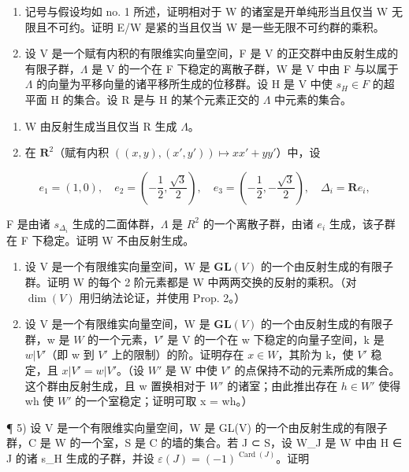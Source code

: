 
\begin{enumerate}
\def\labelenumi{\arabic{enumi})}
\item
  记号与假设均如 no. 1 所述，证明相对于 W 的诸室是开单纯形当且仅当 W 无限且不可约。证明 E/W 是紧的当且仅当 W 是一些无限不可约群的乘积。
\item
  设 V 是一个赋有内积的有限维实向量空间，F 是 V 的正交群中由反射生成的有限子群，\(\Lambda\) 是 V 的一个在 F 下稳定的离散子群，W 是 V 中由 F 与以属于 \(\Lambda\) 的向量为平移向量的诸平移所生成的位移群。设 H 是 V 中使 \(s_{H} \in F\) 的超平面 H 的集合。设 R 是与 H 的某个元素正交的 \(\Lambda\) 中元素的集合。
\end{enumerate}

\begin{enumerate}
\def\labelenumi{\alph{enumi})}
\item
  W 由反射生成当且仅当 R 生成 \(\Lambda\)。
\item
  在 \(\mathbf{R}^2\)（赋有内积 \(((x,y),(x',y'))\mapsto xx' + yy'\)）中，设
\end{enumerate}

\[
e _ {1} = (1, 0), \quad e _ {2} = \left(- \frac {1}{2}, \frac {\sqrt {3}}{2}\right), \quad e _ {3} = \left(- \frac {1}{2}, - \frac {\sqrt {3}}{2}\right), \quad \Delta_ {i} = \mathbf {R} e _ {i},
\]

F 是由诸 \(s_{\Delta_{i}}\) 生成的二面体群，\(\Lambda\) 是 \(R^{2}\) 的一个离散子群，由诸 \(e_{i}\) 生成，该子群在 F 下稳定。证明 W 不由反射生成。

\begin{enumerate}
\def\labelenumi{\arabic{enumi})}
\setcounter{enumi}{2}
\item
  设 V 是一个有限维实向量空间，W 是 \(\mathbf{GL}(V)\) 的一个由反射生成的有限子群。证明 W 的每个 2 阶元素都是 W 中两两交换的反射的乘积。（对 \(\dim(V)\) 用归纳法论证，并使用 Prop. 2。）
\item
  设 V 是一个有限维实向量空间，W 是 \(\mathbf{GL}(V)\) 的一个由反射生成的有限子群，w 是 \(W\) 的一个元素，\(V'\) 是 V 的一个在 w 下稳定的向量子空间，k 是 \(w|V'\)（即 w 到 \(V'\) 上的限制）的阶。证明存在 \(x \in W\)，其阶为 k，使 \(V'\) 稳定，且 \(x|V' = w|V'\)。（设 \(W'\) 是 W 中使 \(V'\) 的点保持不动的元素所成的集合。这个群由反射生成，且 w 置换相对于 \(W'\) 的诸室；由此推出存在 \(h \in W'\) 使得 wh 使 \(W'\) 的一个室稳定；证明可取 x = wh。）
\end{enumerate}

¶ 5) 设 V 是一个有限维实向量空间，W 是 GL(V) 的一个由反射生成的有限子群，C 是 W 的一个室，S 是 C 的墙的集合。若 J ⊂ S，设 W\_J 是 W 中由 H ∈ J 的诸 s\_H 生成的子群，并设 \(\varepsilon(J) = (-1)^{\operatorname{Card}(J)}\)。证明

